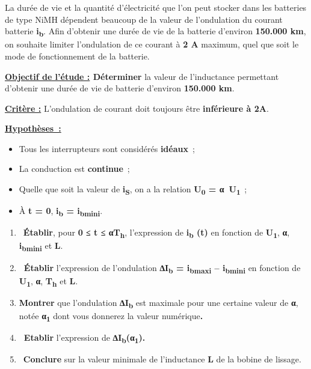 La durée de vie et la quantité d'électricité que l'on peut stocker dans les batteries de type NiMH dépendent beaucoup de la valeur de l'ondulation du courant batterie \textbf{i\textsubscript{b}}. Afin d'obtenir une durée de vie de la batterie d'environ \textbf{150.000 km}, on souhaite limiter l'ondulation de ce courant à \textbf{2 A} maximum, quel que soit le mode de fonctionnement de la batterie.

\textbf{\ul{Objectif de l'étude :} Déterminer} la valeur de l'inductance permettant d'obtenir une durée de vie de batterie d'environ \textbf{150.000 km}.

\textbf{\ul{Critère :}} L'ondulation de courant doit toujours être \textbf{inférieure à 2A}.

\textbf{\ul{Hypothèses~:}}

\begin{itemize}
\item
  Tous les interrupteurs sont considérés \textbf{idéaux}~;
\item
  La conduction est \textbf{continue}~;
\item
  Quelle que soit la valeur de \textbf{i\textsubscript{S}}, on a la relation \textbf{U\textsubscript{0} = α~U\textsubscript{1~}};
\item
  À \textbf{t = 0}, \textbf{i\textsubscript{b} = i\textsubscript{bmini}}.
\end{itemize}

\begin{enumerate}
\def\labelenumi{\arabic{enumi}.}
\setcounter{enumi}{5}
\item
  ~\textbf{Établir}, pour \textbf{0 ≤ t ≤ αT\textsubscript{h}}, l'expression de \textbf{i\textsubscript{b} (t)} en fonction de \textbf{U\textsubscript{1}}, \textbf{α}, \textbf{i\textsubscript{bmini}} et \textbf{L}.
\item
  \textbf{~Établir} l'expression de l'ondulation \textbf{∆I\textsubscript{b} = i\textsubscript{bmaxi} -- i\textsubscript{bmini}} en fonction de \textbf{U\textsubscript{1}}, \textbf{α}, \textbf{T\textsubscript{h}} et \textbf{L}.
\item
  \textbf{Montrer} que l'ondulation \textbf{∆I\textsubscript{b}} est maximale pour une certaine valeur de \textbf{α}, notée \textbf{α\textsubscript{1}} dont vous donnerez la valeur numérique\textbf{.}
\item
  \textbf{~Etablir} l'expression de \textbf{∆I\textsubscript{b}(α\textsubscript{1}).}
\item
  ~\textbf{Conclure} sur la valeur minimale de l'inductance \textbf{L} de la bobine de lissage.
\end{enumerate}

